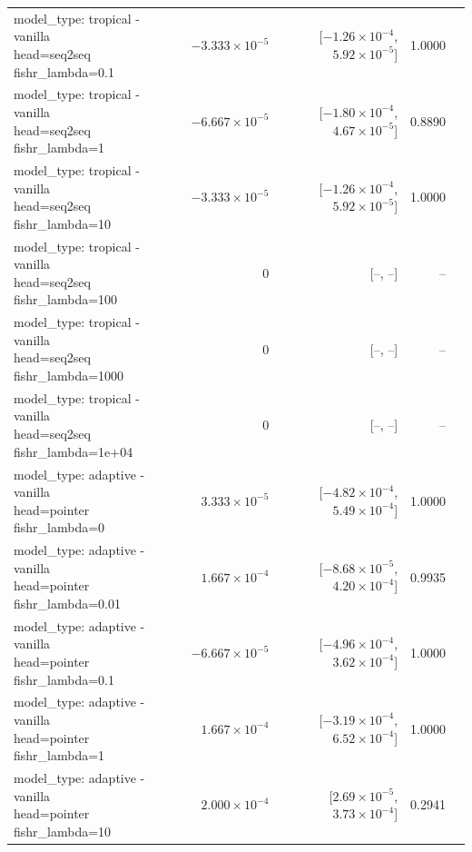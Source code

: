 \documentclass[10pt]{article}
\makeatletter
\newcommand{\stackcell}[1]{\begin{tabular}[t]{@{}l@{}}#1\end{tabular}}
\makeatother
\begin{document}
{\begin{longtable}{lrrrl}
\stackcell{model\_type: tropical - vanilla\\\footnotesize head=seq2seq fishr\_lambda=0.1 } & $-3.333\times10^{-5}$ & [$-1.26\times10^{-4}$, $5.92\times10^{-5}$] & 1.0000 & \\
\stackcell{model\_type: tropical - vanilla\\\footnotesize head=seq2seq fishr\_lambda=1 } & $-6.667\times10^{-5}$ & [$-1.80\times10^{-4}$, $4.67\times10^{-5}$] & 0.8890 & \\
\stackcell{model\_type: tropical - vanilla\\\footnotesize head=seq2seq fishr\_lambda=10 } & $-3.333\times10^{-5}$ & [$-1.26\times10^{-4}$, $5.92\times10^{-5}$] & 1.0000 & \\
\stackcell{model\_type: tropical - vanilla\\\footnotesize head=seq2seq fishr\_lambda=100 } & 0 & [--, --] & -- & \\
\stackcell{model\_type: tropical - vanilla\\\footnotesize head=seq2seq fishr\_lambda=1000 } & 0 & [--, --] & -- & \\
\stackcell{model\_type: tropical - vanilla\\\footnotesize head=seq2seq fishr\_lambda=1e+04 } & 0 & [--, --] & -- & \\
\stackcell{model\_type: adaptive - vanilla\\\footnotesize head=pointer fishr\_lambda=0 } & $3.333\times10^{-5}$ & [$-4.82\times10^{-4}$, $5.49\times10^{-4}$] & 1.0000 & \\
\stackcell{model\_type: adaptive - vanilla\\\footnotesize head=pointer fishr\_lambda=0.01 } & $1.667\times10^{-4}$ & [$-8.68\times10^{-5}$, $4.20\times10^{-4}$] & 0.9935 & \\
\stackcell{model\_type: adaptive - vanilla\\\footnotesize head=pointer fishr\_lambda=0.1 } & $-6.667\times10^{-5}$ & [$-4.96\times10^{-4}$, $3.62\times10^{-4}$] & 1.0000 & \\
\stackcell{model\_type: adaptive - vanilla\\\footnotesize head=pointer fishr\_lambda=1 } & $1.667\times10^{-4}$ & [$-3.19\times10^{-4}$, $6.52\times10^{-4}$] & 1.0000 & \\
\stackcell{model\_type: adaptive - vanilla\\\footnotesize head=pointer fishr\_lambda=10 } & $2.000\times10^{-4}$ & [$2.69\times10^{-5}$, $3.73\times10^{-4}$] & 0.2941 & \\

\end{longtable}}
\end{document}
